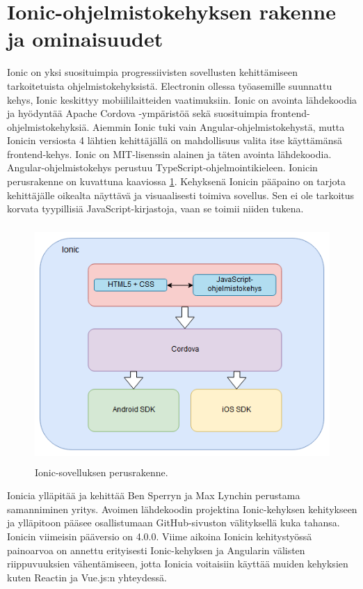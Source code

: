 \documentclass[utf8]{gradu3}
\begin{document}
\section{Ionic-ohjelmistokehyksen rakenne ja ominaisuudet}

Ionic on yksi suosituimpia progressiivisten sovellusten kehittämiseen tarkoitetuista ohjelmistokehyksistä. Electronin ollessa työasemille suunnattu kehys, Ionic keskittyy mobiililaitteiden vaatimuksiin. Ionic on avointa lähdekoodia ja hyödyntää Apache Cordova -ympäristöä sekä suosituimpia frontend-ohjelmistokehyksiä. Aiemmin Ionic tuki vain Angular-ohjelmistokehystä, mutta Ionicin versiosta 4 lähtien kehittäjällä on mahdollisuus valita itse käyttämänsä frontend-kehys. Ionic on MIT-lisenssin alainen ja täten avointa lähdekoodia. Angular-ohjelmistokehys perustuu TypeScript-ohjelmointikieleen. Ionicin perusrakenne on kuvattuna kaaviossa \ref{fig:ionic-structure}. Kehyksenä Ionicin pääpaino on tarjota kehittäjälle oikealta näyttävä ja visuaalisesti toimiva sovellus. Sen ei ole tarkoitus korvata tyypillisiä JavaScript-kirjastoja, vaan se toimii niiden tukena. \parencite[]{ionic-documentation}

\begin{figure}[h]\centering
  \includegraphics[height=9cm,keepaspectratio]{ionic-structure}
  \caption[Ionic-sovelluksen perusrakenne]
  {Ionic-sovelluksen perusrakenne.}
  \label{fig:ionic-structure}
\end{figure}

Ionicia ylläpitää ja kehittää Ben Sperryn ja Max Lynchin perustama samanniminen yritys. Avoimen lähdekoodin projektina Ionic-kehyksen kehitykseen ja ylläpitoon pääsee osallistumaan GitHub-sivuston välityksellä kuka tahansa. Ionicin viimeisin pääversio on 4.0.0. Viime aikoina Ionicin kehitystyössä painoarvoa on annettu erityisesti Ionic-kehyksen ja Angularin välisten riippuvuuksien vähentämiseen, jotta Ionicia voitaisiin käyttää muiden kehyksien kuten Reactin ja Vue.js:n yhteydessä.
\end{document}
